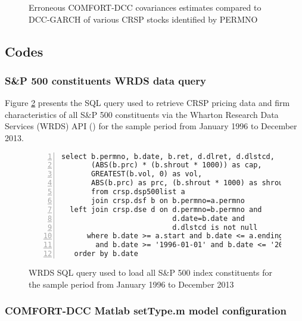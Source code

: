 \documentclass[11pt,a4paper]{article}
\def \indexName {S\&P 500}
\def \periodFrom {January 1996}
\def \periodTo {December 2013}
\begin{document}
\begin{figure}[H]
	\hspace{-5mm}
	\caption{Erroneous COMFORT-DCC covariances estimates compared to DCC-GARCH of various CRSP stocks identified by PERMNO}
	\label{figure:erroneous_covariances}
\end{figure}





\subsection{Codes}

\subsubsection{\indexName{} constituents WRDS data query}

Figure \ref{figure:wrds_data_query} presents the SQL query used to retrieve CRSP pricing data and firm characteristics of all \indexName{} constituents via the Wharton Research Data Services (WRDS) API () for the sample period from \periodFrom{} to \periodTo{}.

\begin{figure}[H]
\begin{samepage}
\begin{lstlisting}[numbers=left]
select b.permno, b.date, b.ret, d.dlret, d.dlstcd,
	   (ABS(b.prc) * (b.shrout * 1000)) as cap,
	   GREATEST(b.vol, 0) as vol,
	   ABS(b.prc) as prc, (b.shrout * 1000) as shrout
       from crsp.dsp500list a
       join crsp.dsf b on b.permno=a.permno
  left join crsp.dse d on d.permno=b.permno and
                          d.date=b.date and
                          d.dlstcd is not null
      where b.date >= a.start and b.date <= a.ending
        and b.date >= '1996-01-01' and b.date <= '2013-12-31'
   order by b.date
\end{lstlisting}
\end{samepage}
\caption{WRDS SQL query used to load all \indexName{} index constituents for the sample period from \periodFrom{} to \periodTo{}}
\label{figure:wrds_data_query}
\end{figure}




\subsubsection{COMFORT-DCC Matlab setType.m model configuration}
\end{document}
